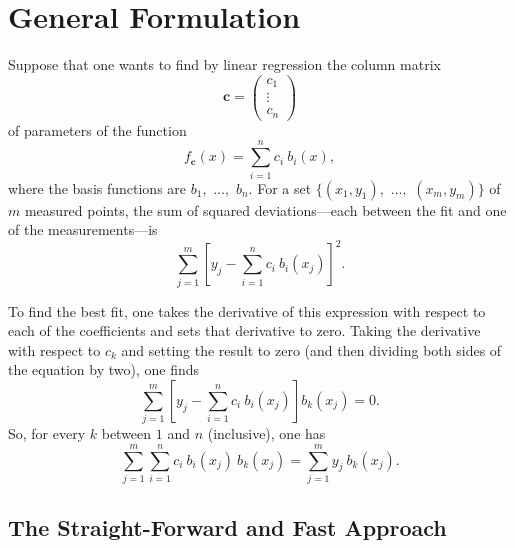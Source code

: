 \documentclass[twocolumn]{article}
\begin{document}
\section{General Formulation}

Suppose that one wants to find by linear regression the column matrix
\begin{equation}
   \mathbf{c} =
   \begin{pmatrix}
      c_1\\
      \vdots\\
      c_n
   \end{pmatrix}
\end{equation}
of parameters of the function
\begin{equation}
   f_{\mathbf{c}}(x) = \sum_{i=1}^{n} c_i \: b_i(x),
\end{equation}
where the basis functions are $b_1,$ $\ldots,$ $b_n$. For a set $\{(x_1,y_1),$
$\ldots,$ $(x_m,y_m)\}$ of $m$ measured points, the sum of squared
deviations---each between the fit and one of the measurements---is
\begin{equation}
   \sum_{j=1}^{m} \left[ y_j - \sum_{i=1}^{n} c_i \: b_i(x_j) \right]^2.
\end{equation}

To find the best fit, one takes the derivative of this expression with respect
to each of the coefficients and sets that derivative to zero. Taking the
derivative with respect to $c_k$ and setting the result to zero (and then
dividing both sides of the equation by two), one finds
\begin{equation}
   \sum_{j=1}^{m} \left[ y_j - \sum_{i=1}^{n} c_i \: b_i(x_j) \right] b_k(x_j)
   = 0.
\end{equation}
So, for every $k$ between $1$ and $n$ (inclusive), one has
\begin{equation}
   \sum_{j=1}^{m} \sum_{i=1}^{n} c_i \: b_i(x_j) \: b_k(x_j) = \sum_{j=1}^{m}
   y_j \: b_k(x_j).
   \label{eq:deriv-result}
\end{equation}

\subsection{The Straight-Forward and Fast Approach}
\end{document}
